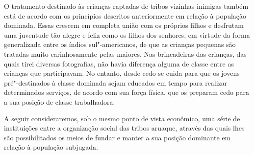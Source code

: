 O tratamento destinado às crianças raptadas de tribos vizinhas inimigas
também está de acordo com os princípios descritos anteriormente em
relação à população dominada. Essas crescem em completa união com os
próprios filhos e desfrutam uma juventude tão alegre e feliz como os
filhos dos senhores, em virtude da forma generalizada entre os índios
sul"-americanos, de que as crianças pequenas são tratadas muito
carinhosamente pelas maiores. Nas brincadeiras das crianças, das quais
tirei diversas fotografias, não havia diferença alguma de classe entre
as crianças que participavam. No entanto, desde cedo se cuida para que
os jovens pré"-destinados à classe dominada sejam educados em tempo para
realizar determinados serviços, de acordo com sua força física, que os
preparam cedo para a sua posição de classe trabalhadora.

A seguir consideraremos, sob o mesmo ponto de vista econômico, uma série
de instituições entre a organização social das tribos aruaque, através
das quais lhes são possibilitados os meios de fundar e manter a sua
posição dominante em relação à população subjugada.

